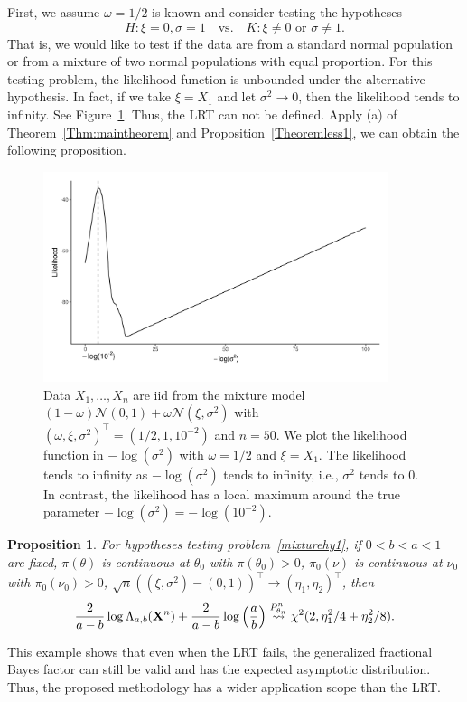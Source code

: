 \documentclass[11pt]{article}
\theoremstyle{plain}
\newtheorem{proposition}{\quad\quad Proposition}
\theoremstyle{definition}
\theoremstyle{remark}
\begin{document}
First, we assume $\omega=1/2$ is known and consider testing the hypotheses
\begin{equation}
    H: \xi=0,\sigma=1\quad \text{vs.} \quad K: \xi\neq 0 \text{ or } \sigma \neq 1.
    \label{mixturehy1}
\end{equation}
That is, we would like to test if the data are from a standard normal population or from a mixture of two normal populations with equal proportion.
For this testing problem, the likelihood function is unbounded under the alternative hypothesis.
In fact, if we take $\xi=X_1$ and let $\sigma^2\to 0$, then the likelihood tends to infinity.
See Figure~\ref{myFigure1}.
Thus, the LRT can not be defined.
Apply (a) of Theorem~\ref{Thm:maintheorem} and Proposition~\ref{Theoremless1}, we can obtain the following proposition.
\begin{figure}
    \begin{center}
        \includegraphics[width=0.9\textwidth]{figure/newnewPP}
    \end{center}
    \caption{
        Data $X_1,\ldots,X_n$ are iid from the mixture model $(1-\omega)\mathcal{N}(0,1)+\omega\mathcal{N}(\xi,\sigma^2)$ with $(\omega,\xi,\sigma^2)^\top =(1/2,1,10^{-2})$ and $n=50$.
        We plot the likelihood function  in $-\log (\sigma^2)$ with $\omega=1/2$ and $\xi=X_1$.
        The likelihood tends to infinity as $-\log (\sigma^2)$ tends to infinity, i.e., $\sigma^2$ tends to $0$.
        In contrast, the likelihood has a local maximum around the true parameter $-\log (\sigma^{2})=-\log (10^{-2})$.
    }
    \label{myFigure1}
\end{figure}
\begin{proposition}
For hypotheses testing problem~\eqref{mixturehy1}, 
if $0< b < a <1$ are fixed, $\pi(\theta)$ is continuous at $\theta_0$ with $\pi(\theta_0) > 0$, $\pi_0 (\nu)$ is continuous at $\nu_0$ with $\pi_0 (\nu_0) > 0 $, $\sqrt{n}((\xi,\sigma^2)-(0,1))^\top \to (\eta_1,\eta_2)^\top  $, then
\begin{equation*}
    \frac{2}{a-b}\log \Lambda_{a,b} (\mathbf{X}^n)
    +\frac{2}{a-b}\log \left(\frac{a}{b}\right)
    \overset{P^n_{\theta_n}}{\rightsquigarrow}
    \chi^2(2,\eta_1^2/4+\eta_2^2/8).
\end{equation*}
    \label{propositionTT}
\end{proposition}
This example shows that even when the LRT fails, the generalized fractional Bayes factor can still be valid and has the expected asymptotic distribution.
Thus, the proposed methodology has a wider application scope than the LRT.
\end{document}
